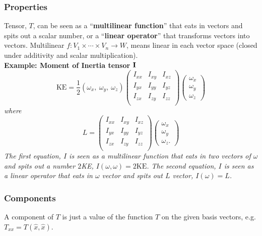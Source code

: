 \subsubsection{Properties}
Tensor, $T$, can be seen as a ``{\bf multilinear function}'' that eats in vectors and spits out a
scalar number, or a ``{\bf linear operator}'' that transforms vectors into vectors. 
Multilinear $f : V_1 \times \cdots \times V_n \rightarrow W$, means linear in each vector space
(closed under additivity and scalar multiplication). \\
{\bf Example: Moment of Inertia tensor ${\bf I}$} \\
\emph{
\begin{equation}
   \text{KE} = \frac{1}{2} (\omega_x, \ \omega_y, \ \omega_z) 
   \begin{pmatrix}
      I_{xx} & I_{xy} & I_{xz} \\
      I_{yx} & I_{yy} & I_{yz} \\
      I_{zx} & I_{zy} & I_{zz} \\
   \end{pmatrix} 
   \begin{pmatrix}
      \omega_x \\ \omega_y \\ \omega_z
   \end{pmatrix}
\end{equation}
where
\begin{equation}
   L =   
   \begin{pmatrix}
      I_{xx} & I_{xy} & I_{xz} \\
      I_{yx} & I_{yy} & I_{yz} \\
      I_{zx} & I_{zy} & I_{zz} \\
   \end{pmatrix} 
   \begin{pmatrix}
      \omega_x \\ \omega_y \\ \omega_z.
   \end{pmatrix}
\end{equation}
The first equation, $I$ is seen as a multilinear function that eats in two vectors of $\omega$ and
spits out a number $2$KE, $I(\omega,\omega) = 2\text{KE}$.
The second equation, $I$ is seen as a linear operator that eats in $\omega$ vector and spits out $L$
vector, $I(\omega) = L$. \\
}
\subsubsection{Components}
A component of $T$ is just a value of the function $T$ on the given basis vectors, e.g. $T_{xx}= T(\hat{x},\hat{x})$. 

